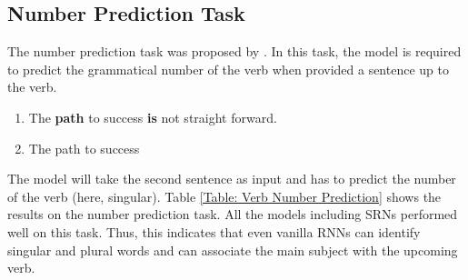 \documentclass[11pt,a4paper]{article}
\begin{document}
\subsection{Number Prediction Task}
\label{Number Prediction Task}
The number prediction task was proposed by \citet{linzen2016assessing}. In this task, the model is required to predict the grammatical number of the verb when provided a sentence up to the verb.
\begin{enumerate}
    \item The \textbf{path} to success \textbf{is} not straight forward.
    \item The path to success  
\end{enumerate}
The model will take the second sentence as input and has to predict the number of the verb (here, singular). Table \ref{Table: Verb Number Prediction} shows the results on the number prediction task. All the models including SRNs performed well on this task. Thus, this indicates that even vanilla RNNs can identify singular and plural words and can associate the main subject with the upcoming verb. 
\begin{table}[!ht]
\centering
{}
\caption{\label{Table: Verb Number Prediction}\% Accuracy of models when tested on  1.4 million sentences for the number prediction and grammaticality judgement tasks.}
\end{table}
\end{document}
